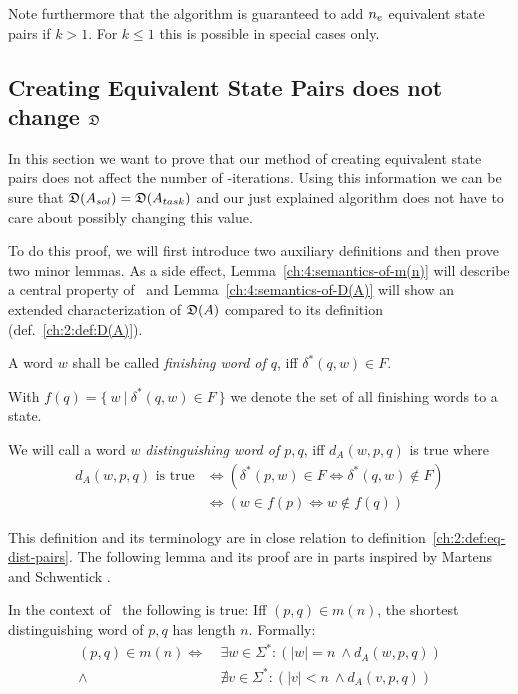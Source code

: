 Note furthermore that the algorithm is guaranteed to add ${n_e}$ equivalent state pairs if $k > 1$. For $k \le 1$ this is possible in special cases only.

\subsection{Creating Equivalent State Pairs does not change \texorpdfstring{$\mathfrak{D}$}{D}} \label{ch:4:sec-D-proof}

In this section we want to prove that our method of creating equivalent state pairs does not affect the number of \CompDist-iterations. Using this information we can be sure that $\mathfrak{D}(A_{sol}) = \mathfrak{D}(A_{task})$ and our just explained algorithm does not have to care about possibly changing this value.

To do this proof, we will first introduce two auxiliary definitions and then prove two minor lemmas. As a side effect, Lemma~\ref{ch:4:semantics-of-m(n)} will describe a central property of \CompDist\ and Lemma~\ref{ch:4:semantics-of-D(A)} will show an extended characterization of $\mathfrak{D}(A)$ compared to its definition (def.~\ref{ch:2:def:D(A)}).

A word $w$ shall be called \emph{finishing word of $q$}, iff $\delta^*(q, w) \in F$.

With $f(q) = \{\ w\ |\ \delta^*(q, w) \in F\ \}$ we denote the set of all finishing words to a state.
\begin{definition} \label{ch:4:def-dist-word}
	We will call a word $w$ \emph{distinguishing word of $p,q$}, iff $d_A(w, p, q)$ is true where
	\begin{align*}
	d_A(w, p, q) \text{ is true} &\Leftrightarrow (\delta^*(p,w) \in F \Leftrightarrow \delta^*(q,w) \notin F) \\
	&\Leftrightarrow (w \in f(p) \Leftrightarrow w \notin f(q))
	\end{align*}
\end{definition}
\noindent This definition and its terminology are in close relation to definition~\ref{ch:2:def:eq-dist-pairs}. The following lemma and its proof are in parts inspired by Martens and Schwentick \cite[ch.\ 4 p.\ 18]{MS18}.

\begin{lemma}\label{ch:4:semantics-of-m(n)}
    In the context of \CompDist\ the following is true: Iff $(p,q)\in m(n)$, the shortest distinguishing word of $p,q$ has length $n$. Formally:
    \begin{align*}
        (p,q) \in m(n) \Longleftrightarrow\ &\exists w\in\Sigma^*\colon (|w| = n\ \land d_A(w, p, q))\\
        \land\ &\nexists v\in\Sigma^*\colon (|v| < n\ \land d_A(v, p, q))
    \end{align*}
\end{lemma}

